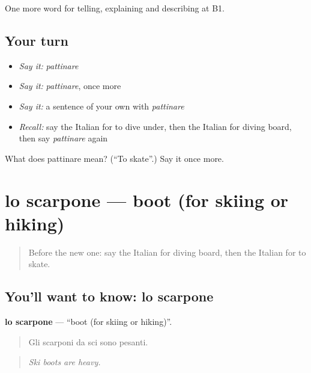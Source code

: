 \begin{grammarlens}[title={What you've built}]
One more word for telling, explaining and describing at B1.
\end{grammarlens}

\subsection*{Your turn}
\begin{itemize}
\raggedright
  \item \emph{Say it:} \emph{pattinare}
  \item \emph{Say it:} \emph{pattinare}, once more
  \item \emph{Say it:} a sentence of your own with \emph{pattinare}
  \item \emph{Recall:} say the Italian for to dive under, then the Italian for diving board, then say \emph{pattinare} again
\end{itemize}

\begin{tcolorbox}[breakable,colback=teal!4,colframe=teal!35!black,title={Before you move on}]
What does pattinare mean? (\textquotedblleft{}To skate\textquotedblright{}.) Say it once more.
\end{tcolorbox}
\section[lo scarpone]{lo scarpone — boot (for skiing or hiking)}

\label{lesson:IT-C515-scarpone}



\begin{quote}
Before the new one: say the Italian for diving board, then the Italian for to skate.
\end{quote}

\subsection*{You'll want to know: lo scarpone}
\textbf{lo scarpone} — \textquotedblleft{}boot (for skiing or hiking)\textquotedblright{}.

\begin{quote}
Gli scarponi da sci sono pesanti.
\end{quote}

\begin{quote}
\emph{Ski boots are heavy.}
\end{quote}

